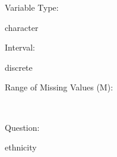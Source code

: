 \documentclass[
]{article}
\begin{document}
\begin{minipage}[t]{0.3\linewidth}

Variable Type:

\end{minipage}%
\begin{minipage}[t]{0.7\linewidth}

character

\end{minipage}

\begin{minipage}[t]{0.3\linewidth}

Interval:

\end{minipage}%
\begin{minipage}[t]{0.7\linewidth}

discrete

\end{minipage}

\begin{minipage}[t]{0.3\linewidth}

Range of Missing Values (M):

\end{minipage}%
\begin{minipage}[t]{0.7\linewidth}

~

\end{minipage}

\begin{minipage}[t]{0.3\linewidth}

Question:

\end{minipage}%
\begin{minipage}[t]{0.7\linewidth}

ethnicity

\end{minipage}
\end{document}
